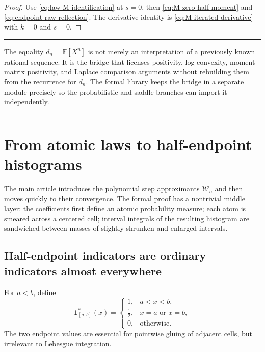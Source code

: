 \documentclass[11pt,oneside]{article}
\theoremstyle{definition}
\theoremstyle{remark}
\newcommand{\E}{\mathbb E}
\newcommand{\Wcal}{\mathcal W}
\newenvironment{boxedremark}{%
  \par\smallskip\noindent\begin{center}\begin{minipage}{0.94\textwidth}%
  \color{black}\hrule\vspace{0.6em}\small
}{%
  \vspace{0.6em}\hrule\end{minipage}\end{center}\smallskip
}
\begin{document}
\begin{proof}
Use \eqref{eq:law-M-identification} at $s=0$, then
\eqref{eq:M-zero-half-moment} and \eqref{eq:endpoint-raw-reflection}.  The derivative identity
is \eqref{eq:M-iterated-derivative} with $k=0$ and $s=0$.
\end{proof}

\begin{boxedremark}
The equality $d_n=\E[X^n]$ is not merely an interpretation of a previously known rational
sequence.  It is the bridge that licenses positivity, log-convexity, moment-matrix
positivity, and Laplace comparison arguments without rebuilding them from the recurrence for
$d_n$.  The formal library keeps the bridge in a separate module precisely so the
probabilistic and saddle branches can import it independently.
\end{boxedremark}

\section{From atomic laws to half-endpoint histograms}
\label{sec:step-measure-bridge}

The main article introduces the polynomial step approximants $\Wcal_n$ and then moves quickly
to their convergence.  The formal proof has a nontrivial middle layer: the coefficients first
define an atomic probability measure; each atom is smeared across a centered cell; interval
integrals of the resulting histogram are sandwiched between masses of slightly shrunken and
enlarged intervals.

\subsection{Half-endpoint indicators are ordinary indicators almost everywhere}

For $a<b$, define
\begin{equation}
 \mathbf1_{[a,b]}^*(x)=
 \begin{cases}
  1,&a<x<b,\\
  \tfrac12,&x=a\text{ or }x=b,\\
  0,&\text{otherwise}.
 \end{cases}
 \label{eq:half-endpoint-indicator}
\end{equation}
The two endpoint values are essential for pointwise gluing of adjacent cells, but irrelevant
to Lebesgue integration.
\end{document}
